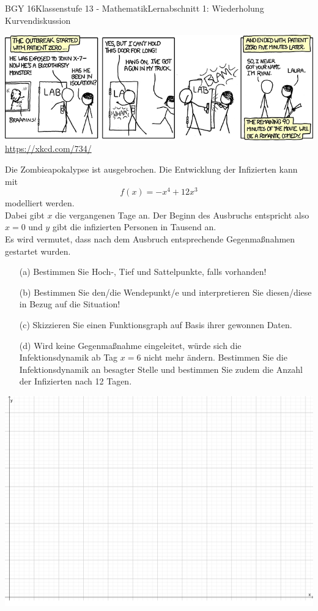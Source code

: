 \documentclass[oneside,openany,headings=optiontotoc,11pt,numbers=noenddot]{scrreprt}
\begin{document}
\begin{worksheet}{BGY 16}{Klassenstufe 13 - Mathematik}{Lernabschnitt 1: Wiederholung Kurvendiskussion}
\begin{center}
		\end{center}
		\newpage
		\includegraphics[width=\textwidth]{../99_Bilder/outbreak.png}\\
		\tiny{\color{codegray}\href{https://xkcd.com/734/}{https://xkcd.com/734/}}
		\normalsize
		\begin{framed}
			\noindent
			Die Zombieapokalypse ist ausgebrochen. Die Entwicklung der Infizierten kann mit \[f(x) = -x^4 + 12x^3\] modelliert werden.\\
			Dabei gibt \(x\) die vergangenen Tage an. Der Beginn des Ausbruchs entspricht also \(x = 0\) und \(y\) gibt die infizierten Personen in Tausend an.\\
			Es wird vermutet, dass nach dem Ausbruch entsprechende Gegenmaßnahmen gestartet wurden.
		\end{framed}
		\begin{itemize}
			\item[(a)] Bestimmen Sie Hoch-, Tief und Sattelpunkte, falls vorhanden!
			\item[(b)] Bestimmen Sie den/die Wendepunkt/e und interpretieren Sie diesen/diese in Bezug auf die Situation!
			\item[(c)] Skizzieren Sie einen Funktionsgraph auf Basis ihrer gewonnen Daten.
			\item[(d)] Wird keine Gegenmaßnahme eingeleitet, würde sich die Infektionsdynamik ab Tag \(x = 6\) nicht mehr ändern. Bestimmen Sie die Infektionsdynamik an besagter Stelle und bestimmen Sie zudem die Anzahl der Infizierten nach 12 Tagen.
		\end{itemize}
		\begin{center}
			\includegraphics[width=\textwidth]{../99_Bilder/00_Wdh/KoordLeer1.png}

\end{center}
\end{worksheet}
\end{document}
